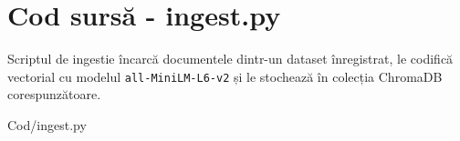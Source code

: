 \chapter{Cod sursă - ingest.py}
\label{anexa:ingest}

Scriptul de ingestie încarcă documentele dintr-un dataset înregistrat, le
codifică vectorial cu modelul \texttt{all-MiniLM-L6-v2} și le stochează în
colecția ChromaDB corespunzătoare.


  {Cod/ingest.py}

